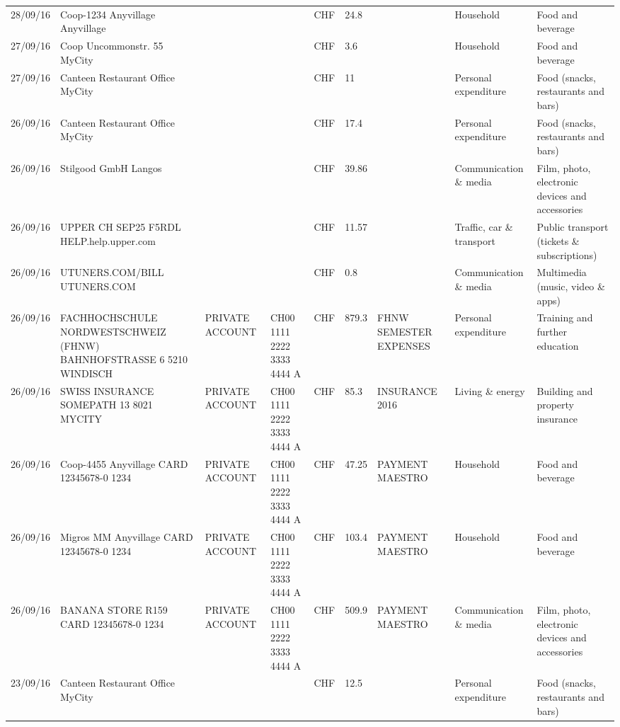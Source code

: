 \begin{landscape}
\begin{center}
\begin{longtable}{lllllllll}
		28/09/16 & Coop-1234 Anyvillage    Anyvillage &       &       & CHF   & 24.8  &       & Household & Food and beverage \\
		27/09/16 & Coop Uncommonstr. 55   MyCity &       &       & CHF   & 3.6   &       & Household & Food and beverage \\
		27/09/16 & Canteen Restaurant Office      MyCity &       &       & CHF   & 11    &       & Personal expenditure & Food (snacks, restaurants and bars) \\
		26/09/16 & Canteen Restaurant Office      MyCity &       &       & CHF   & 17.4  &       & Personal expenditure & Food (snacks, restaurants and bars) \\
		26/09/16 & Stilgood GmbH             Langos &       &       & CHF   & 39.86 &       & Communication \& media & Film, photo, electronic devices and accessories \\
		26/09/16 & UPPER CH SEP25 F5RDL HELP.help.upper.com &       &       & CHF   & 11.57 &       & Traffic, car \& transport & Public transport (tickets \& subscriptions) \\
		26/09/16 & UTUNERS.COM/BILL          UTUNERS.COM &       &       & CHF   & 0.8   &       & Communication \& media & Multimedia (music, video \& apps) \\
		26/09/16 & FACHHOCHSCHULE NORDWESTSCHWEIZ (FHNW) BAHNHOFSTRASSE 6 5210 WINDISCH & PRIVATE ACCOUNT & CH00 1111 2222 3333 4444 A & CHF   & 879.3 & FHNW SEMESTER EXPENSES & Personal expenditure & Training and further education \\
		26/09/16 & SWISS INSURANCE SOMEPATH 13 8021 MYCITY & PRIVATE ACCOUNT & CH00 1111 2222 3333 4444 A & CHF   & 85.3  & INSURANCE 2016 & Living \& energy & Building and property insurance \\
		26/09/16 & Coop-4455 Anyvillage CARD 12345678-0 1234 & PRIVATE ACCOUNT & CH00 1111 2222 3333 4444 A & CHF   & 47.25 & PAYMENT MAESTRO & Household & Food and beverage \\
		26/09/16 & Migros MM Anyvillage CARD 12345678-0 1234 & PRIVATE ACCOUNT & CH00 1111 2222 3333 4444 A & CHF   & 103.4 & PAYMENT MAESTRO & Household & Food and beverage \\
		26/09/16 & BANANA STORE R159 CARD 12345678-0 1234 & PRIVATE ACCOUNT & CH00 1111 2222 3333 4444 A & CHF   & 509.9 & PAYMENT MAESTRO & Communication \& media & Film, photo, electronic devices and accessories \\
		23/09/16 & Canteen Restaurant Office      MyCity &       &       & CHF   & 12.5  &       & Personal expenditure & Food (snacks, restaurants and bars) \\

\end{longtable}
\end{center}
\end{landscape}

